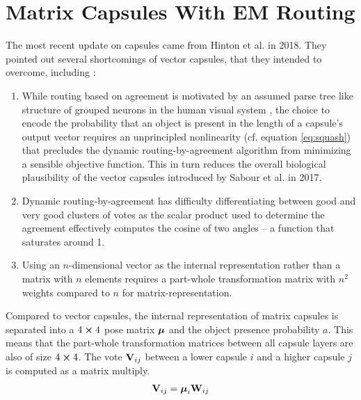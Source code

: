 \section{Matrix Capsules With EM Routing}
The most recent update on capsules came from Hinton et al. in 2018. They pointed out several shortcomings of vector capsules, that they intended to overcome, including \cite{hinton2018matrix}:
\begin{enumerate}
    \item While routing based on agreement is motivated by an assumed parse tree like structure of grouped neurons in the human visual system \cite{hinton2000learning}, the choice to encode the probability that an object is present in the length of a capsule's output vector requires an unprincipled nonlinearity (cf. equation \ref{eq:squash}) that precludes the dynamic routing-by-agreement algorithm from minimizing a sensible objective function. This in turn reduces the overall biological plausibility of the vector capsules introduced by Sabour et al. in 2017.
    \item Dynamic routing-by-agreement has difficulty differentiating between good and very good clusters of votes as the scalar product used to determine the agreement effectively computes the cosine of two angles -- a function that saturates around 1.
    \item Using an $n$-dimensional vector as the internal representation rather than a matrix with $n$ elements requires a part-whole transformation matrix with $n^2$ weights compared to $n$ for matrix-representation.
\end{enumerate}
Compared to vector capsules, the internal representation of matrix capsules is separated into a $4\cross 4$ pose matrix $\vb*{\mu}$ and the object presence probability $a$. This means that the part-whole transformation matrices between all capsule layers are also of size $4\cross 4$. The vote $\vb{V}_{ij}$ between a lower capsule $i$ and a higher capsule $j$ is computed as a matrix multiply.
\begin{align}
    \vb{V}_{ij} = \vb*{\mu}_i \vb{W}_{ij}
\end{align}
